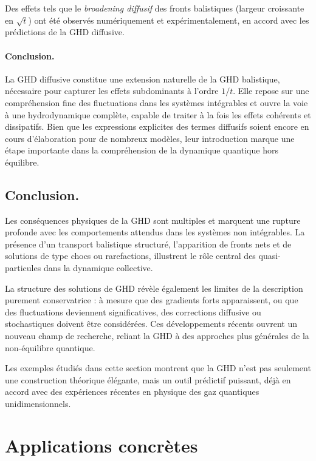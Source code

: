 Des effets tels que le \emph{broadening diffusif} des fronts balistiques (largeur croissante en $\sqrt{t}$) ont été observés numériquement et expérimentalement, en accord avec les prédictions de la GHD diffusive.

\paragraph{Conclusion.}
La GHD diffusive constitue une extension naturelle de la GHD balistique, nécessaire pour capturer les effets subdominants à l’ordre $1/t$. Elle repose sur une compréhension fine des fluctuations dans les systèmes intégrables et ouvre la voie à une hydrodynamique complète, capable de traiter à la fois les effets cohérents et dissipatifs. Bien que les expressions explicites des termes diffusifs soient encore en cours d'élaboration pour de nombreux modèles, leur introduction marque une étape importante dans la compréhension de la dynamique quantique hors équilibre.


\subsection*{Conclusion.}
Les conséquences physiques de la GHD sont multiples et marquent une rupture profonde avec les comportements attendus dans les systèmes non intégrables. La présence d’un transport balistique structuré, l’apparition de fronts nets et de solutions de type chocs ou rarefactions, illustrent le rôle central des quasi-particules dans la dynamique collective.

La structure des solutions de GHD révèle également les limites de la description purement conservatrice : à mesure que des gradients forts apparaissent, ou que des fluctuations deviennent significatives, des corrections diffusive ou stochastiques doivent être considérées. Ces développements récents ouvrent un nouveau champ de recherche, reliant la GHD à des approches plus générales de la non-équilibre quantique.

Les exemples étudiés dans cette section montrent que la GHD n’est pas seulement une construction théorique élégante, mais un outil prédictif puissant, déjà en accord avec des expériences récentes en physique des gaz quantiques unidimensionnels.

\section{Applications concrètes}

